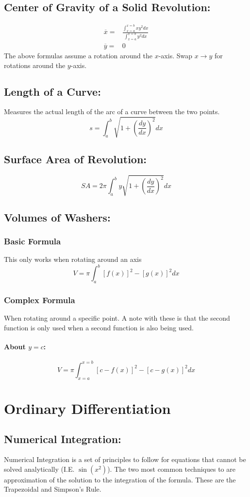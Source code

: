 \documentclass[a5paper]{article}
\begin{document}
	\subsection{Center of Gravity of a Solid Revolution:}
	\begin{align*}
		\overline{x}=&\frac{\int^{x=b}_{x=a}xy^{2}dx}{\int^{x=b}_{x=a}y^{2}dx}\\
		\overline{y}=&0
	\end{align*}
	The above formulas assume a rotation around the $x$-axis. Swap $x\to y$ for rotations around the $y$-axis.
	\subsection{Length of a Curve:}
	Measures the actual length of the arc of a curve between the two points.
	$$s=\int^{b}_{a}\sqrt{1+(\frac{dy}{dx})^{2}}dx$$
	\subsection{Surface Area of Revolution:}
	$$SA=2\pi\int^{b}_{a}y\sqrt{1+(\frac{dy}{dx})^{2}}dx$$
	\subsection{Volumes of Washers:}
	\subsubsection{Basic Formula}
	This only works when rotating around an axis
	$$V=\pi\int^{b}_{a}[f(x)]^{2}-[g(x)]^{2}dx$$
	\subsubsection{Complex Formula}
	When rotating around a specific point. A note with these is that the second function is only used when a second function is also being used.
	\paragraph{About $y=c$:}
	$$V=\pi\int^{x=b}_{x=a}[c-f(x)]^{2}-[c-g(x)]^{2}dx$$

	\pagebreak

	\section{Ordinary Differentiation}
	\subsection{Numerical Integration:}
	Numerical Integration is a set of principles to follow for equations that cannot be solved analytically (I.E. $\sin{(x^{2})}$). The two most common techniques to are approximation of the solution to the integration of the formula. These are the Trapezoidal and Simpson's Rule.
\end{document}
